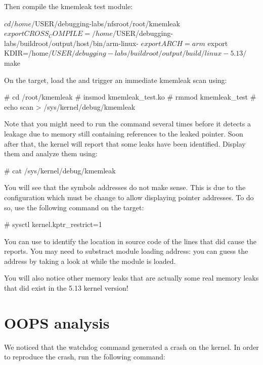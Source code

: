 Then compile the kmemleak test module:

\begin{bashinput}
$ cd /home/$USER/debugging-labs/nfsroot/root/kmemleak
$ export CROSS_COMPILE=/home/$USER/debugging-labs/buildroot/output/host/bin/arm-linux-
$ export ARCH=arm
$ export KDIR=/home/$USER/debugging-labs/buildroot/output/build/linux-5.13/
$ make
\end{bashinput}

On the target, load the  and trigger an immediate
kmemleak scan using:

\begin{bashinput}
# cd /root/kmemleak
# insmod kmemleak_test.ko
# rmmod kmemleak_test
# echo scan > /sys/kernel/debug/kmemleak
\end{bashinput}

Note that you might need to run the  command several times
before it detects a leakage due to memory still containing references to
the leaked pointer. Soon after that, the kernel will report that some leaks
have been identified. Display them and analyze them using:

\begin{bashinput}
# cat /sys/kernel/debug/kmemleak
\end{bashinput}

You will see that the symbols addresses do not make sense. This is due to the
 configuration which must be change to allow displaying
pointer addresses. To do so, use the following command on the target:

\begin{bashinput}
# sysctl kernel.kptr_restrict=1
\end{bashinput}

You can use  to identify the location in source code of the
lines that did cause the reports. You may need to substract module loading address:
you can guess the address by taking a look at  while the module
is loaded.

You will also notice other memory leaks that are actually some real memory leaks
that did exist in the 5.13 kernel version!

\section{OOPS analysis}
We noticed that the watchdog command generated a crash on the kernel. In order
to reproduce the crash, run the following command:

